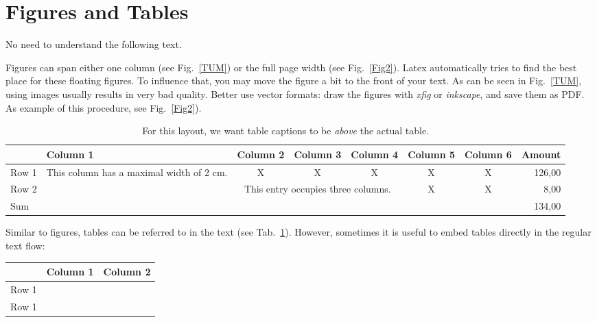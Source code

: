 \documentclass[twocolumn]{article}
\begin{document}
\section{Figures and Tables}

No need to understand the following text.

Figures can span either one column (see Fig.~\ref{TUM}) or the full
page width (see Fig.~\ref{Fig2}).
Latex automatically tries to find the best place for these floating
figures. To influence that, you may move the figure a bit to the front
of your text.
As can be seen in Fig.~\ref{TUM}, using images usually results in very
bad quality. Better use vector formats: draw the figures with
{\em xfig} or {\em inkscape}, and save them as PDF. As example of
this procedure, see Fig.~\ref{Fig2}).

\begin{table}
\caption{For this layout, we want table captions to be {\em above} the actual table.}
\label{Tab1}
\begin{center}
\begin{tabular}{|l|p{2cm}|c|c|c|c|c|r|}
\hline
	& Column 1 & Column 2 & Column 3 & Column 4& Column 5& Column 6& Amount\\
\hline
Row 1 & This column has a maximal width of 2 cm.& X & X& X& X& X& 126,00\\
\hline
Row 2 & & \multicolumn{3}{p{5cm}|}{This entry occupies three columns.}& X &X & 8,00\\
\hline
\multicolumn{7}{|l}{Sum} &134,00\\
\hline
\end{tabular}
\end{center}
\end{table}

Similar to figures, tables can be referred to in the text (see Tab.~\ref{Tab1}).
However, sometimes it is useful to embed tables directly in the regular
text flow:

\begin{center}
\begin{tabular}{|c|c|c|}
\hline
	& Column 1 & Column 2 \\
\hline
Row 1 & & \\
Row 1 & & \\
\hline
\end{tabular}
\end{center}
\end{document}
